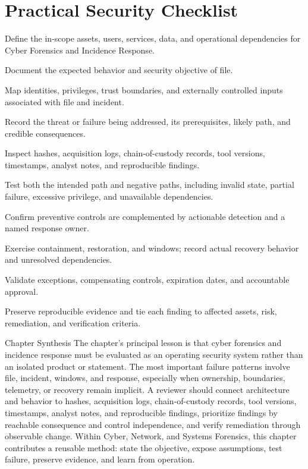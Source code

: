 \documentclass[11pt,letterpaper]{article}
\begin{document}
\section*{Practical Security Checklist}
\begin{CornellChecklist}
\item Define the in-scope assets, users, services, data, and operational dependencies for Cyber Forensics and Incidence Response.
\item Document the expected behavior and security objective of file.
\item Map identities, privileges, trust boundaries, and externally controlled inputs associated with file and incident.
\item Record the threat or failure being addressed, its prerequisites, likely path, and credible consequences.
\item Inspect hashes, acquisition logs, chain-of-custody records, tool versions, timestamps, analyst notes, and reproducible findings.
\item Test both the intended path and negative paths, including invalid state, partial failure, excessive privilege, and unavailable dependencies.
\item Confirm preventive controls are complemented by actionable detection and a named response owner.
\item Exercise containment, restoration, and windows; record actual recovery behavior and unresolved dependencies.
\item Validate exceptions, compensating controls, expiration dates, and accountable approval.
\item Preserve reproducible evidence and tie each finding to affected assets, risk, remediation, and verification criteria.
\end{CornellChecklist}
\begin{CornellSummaryBox}{Chapter Synthesis}
The chapter's principal lesson is that cyber forensics and incidence response must be evaluated as an operating security system rather than an isolated product or statement. The most important failure patterns involve file, incident, windows, and response, especially when ownership, boundaries, telemetry, or recovery remain implicit. A reviewer should connect architecture and behavior to hashes, acquisition logs, chain-of-custody records, tool versions, timestamps, analyst notes, and reproducible findings, prioritize findings by reachable consequence and control independence, and verify remediation through observable change. Within Cyber, Network, and Systems Forensics, this chapter contributes a reusable method: state the objective, expose assumptions, test failure, preserve evidence, and learn from operation.
\end{CornellSummaryBox}
\end{document}
